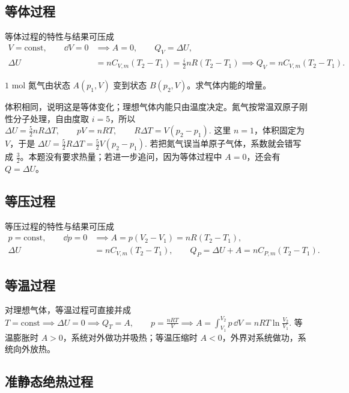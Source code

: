 \documentclass[lang=cn,11pt]{elegantbook}
\begin{document}
\subsection{等体过程}

等体过程的特性与结果可压成
\begin{align*}
V=\text{const},\qquad \dd V=0
&\implies A=0,\qquad Q_V=\Delta U,\\
\Delta U&=nC_{V,m}(T_2-T_1)=\frac{i}{2}nR(T_2-T_1)
\implies Q_V=nC_{V,m}(T_2-T_1).
\end{align*}

\begin{exercise}
\(1\) mol 氮气由状态 \(A(p_1,V)\) 变到状态 \(B(p_2,V)\)。求气体内能的增量。
\end{exercise}

\begin{solution}
体积相同，说明这是等体变化；理想气体内能只由温度决定。氮气按常温双原子刚性分子处理，自由度取 \(i=5\)，所以
 \(\Delta U=\frac52 nR\Delta T,\qquad pV=nRT,\qquad R\Delta T=V(p_2-p_1).\) 
这里 \(n=1\)，体积固定为 \(V\)，于是
 \(\Delta U =\frac52 R\Delta T =\frac52 V(p_2-p_1).\) 
若把氮气误当单原子气体，系数就会错写成 \(\frac32\)。本题没有要求热量；若进一步追问，因为等体过程中 \(A=0\)，还会有 \(Q=\Delta U\)。
\end{solution}

\subsection{等压过程}

等压过程的特性与结果可压成
\begin{align*}
p=\text{const},\qquad \dd p=0
&\implies A=p(V_2-V_1)=nR(T_2-T_1),\\
\Delta U&=nC_{V,m}(T_2-T_1),\qquad
Q_P=\Delta U+A=nC_{P,m}(T_2-T_1).
\end{align*}

\subsection{等温过程}

对理想气体，等温过程可直接并成
 \(T=\text{const} \implies \Delta U=0 \implies Q_T=A,\qquad p=\frac{nRT}{V} \implies A=\int_{V_1}^{V_2}p\,\dd V=nRT\ln\frac{V_2}{V_1}.\) 
等温膨胀时 \(A>0\)，系统对外做功并吸热；等温压缩时 \(A<0\)，外界对系统做功，系统向外放热。

\subsection{准静态绝热过程}
\end{document}
